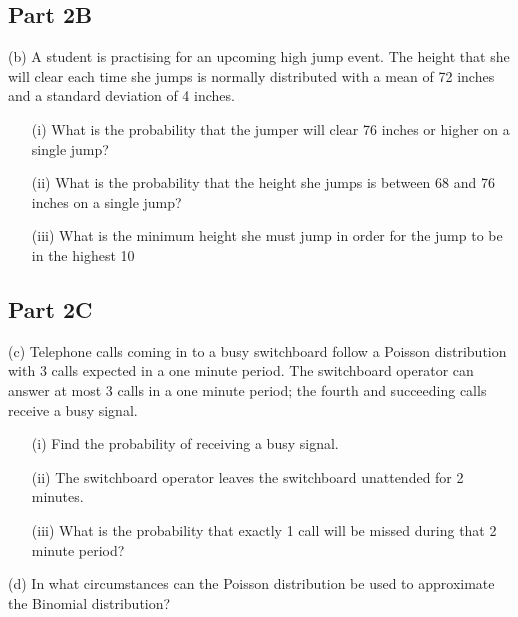 
\subsection*{Part 2B}
(b)	A student is practising for an upcoming high jump event.  The height that she will clear each time she jumps is normally distributed with a 
mean of 72 inches and a standard deviation of 4 inches.  
\begin{itemize}
\item[(i)]  	What is the probability that the jumper will clear 76 inches or higher on a single jump?
\item[(ii)]  	What is the probability that the height she jumps is between 68 and 76 inches on a single jump?
\item[(iii)]  	What is the minimum height she must jump in order for the jump to be in the highest 10%
\end{itemize}
    

\subsection*{Part 2C}
(c)	Telephone calls coming in to a busy switchboard follow a Poisson distribution with 3 calls expected in a one minute period.  
The switchboard operator can answer at most 3 calls in a one minute period; the fourth and succeeding calls receive a busy signal.
\begin{itemize} 
\item[(i)]  	   Find the probability of receiving a busy signal.
\item[(ii)]  	   The switchboard operator leaves the switchboard unattended for 2 minutes.  
\item[(iii)]  What is the probability that exactly 1 call will be missed during that 2 minute period?
\end{itemize}       

(d)	In what circumstances can the Poisson distribution be used to approximate the Binomial distribution?
      
